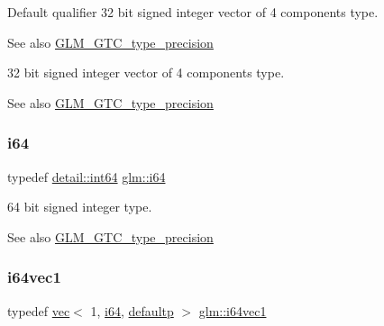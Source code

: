 Default qualifier 32 bit signed integer vector of 4 components type. \begin{DoxySeeAlso}{See also}
\hyperlink{group__gtc__type__precision}{G\+L\+M\+\_\+\+G\+T\+C\+\_\+type\+\_\+precision}
\end{DoxySeeAlso}
32 bit signed integer vector of 4 components type. \begin{DoxySeeAlso}{See also}
\hyperlink{group__gtc__type__precision}{G\+L\+M\+\_\+\+G\+T\+C\+\_\+type\+\_\+precision} 
\end{DoxySeeAlso}
\mbox{\label{group__gtc__type__precision_gac7a7eaad46064fc952b06df33689da23}} 
\subsubsection{\texorpdfstring{i64}{i64}}
{\footnotesize\ttfamily typedef \hyperlink{namespaceglm_1_1detail_a5b1c3227ec636c24a0676746381adfc8}{detail\+::int64} \hyperlink{group__gtc__type__precision_gac7a7eaad46064fc952b06df33689da23}{glm\+::i64}}

64 bit signed integer type. \begin{DoxySeeAlso}{See also}
\hyperlink{group__gtc__type__precision}{G\+L\+M\+\_\+\+G\+T\+C\+\_\+type\+\_\+precision} 
\end{DoxySeeAlso}
\mbox{\label{group__gtc__type__precision_gad2bbfb4ed2d4b1e1551c721f81739e49}} 
\subsubsection{\texorpdfstring{i64vec1}{i64vec1}}
{\footnotesize\ttfamily typedef \hyperlink{structglm_1_1vec}{vec}$<$ 1, \hyperlink{group__gtc__type__precision_gac7a7eaad46064fc952b06df33689da23}{i64}, \hyperlink{namespaceglm_a36ed105b07c7746804d7fdc7cc90ff25a9d21ccd8b5a009ec7eb7677befc3bf51}{defaultp} $>$ \hyperlink{group__gtc__type__precision_gad2bbfb4ed2d4b1e1551c721f81739e49}{glm\+::i64vec1}}

